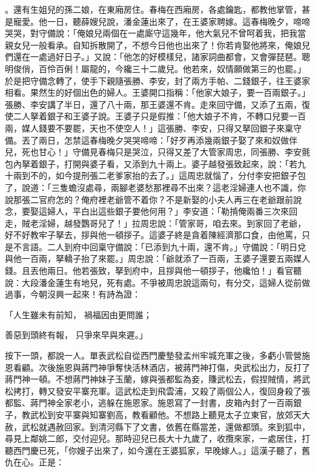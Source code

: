 \begin{showcontents}{}
。還有生姐兒的孫二娘，在東廂房住。春梅在西廂房，各處鑰匙，都教他掌管，甚是寵愛。他一日，聽薛嫂兒說，潘金蓮出來了，在王婆家聘嫁。這春梅晚夕，啼啼哭哭，對守備說：「俺娘兒兩個在一處廝守這幾年，他大氣兒不曾呵着我，把我當親女兒一般看承。自知拆散開了，不想今日他也出來了！你若肯娶他將來，俺娘兒們還在一處過好日子。」又說：「他怎的好模樣兒，諸家詞曲都會，又會彈琵琶。聰明俊俏，百伶百俐！屬龍的，今纔三十二歲兒。他若來，奴情願做第三的也罷。」於是把守備念轉了，使手下親隨張勝、李安，封了兩方手帕、二錢銀子，往王婆家相看。果然生的好個出色的婦人。王婆開口指稱：「他家大娘子，要一百兩銀子。」張勝、李安講了半日，還了八十兩，那王婆還不肯。走來回守備，又添了五兩，復使二人拏着銀子和王婆子說。王婆子只是假推：「他大娘子不肯，不轉口兒要一百兩，媒人錢要不要罷，天也不使空人！」這張勝、李安，只得又拏回銀子來稟守備。丟了兩日，怎禁這春梅晚夕哭哭啼啼：「好歹再添幾兩銀子娶了來和奴做伴兒，死也甘心！」守備見春梅只是哭泣，只得又差了大管家周忠，同張勝、李安氈包內拏着銀子，打開與婆子看，又添到九十兩上。婆子越發張致起來，說：「若九十兩到不的，如今提刑張二老爹家抬的去了。」這周忠就惱了，分付李安把銀子包了，說道：「三隻蟾沒處尋，兩腳老婆愁那裡尋不出來？這老淫婦連人也不識，你說那張二官府怎的？俺府裡老爺管不着你？不是新娶的小夫人再三在老爺跟前說念，要娶這婦人，平白出這些銀子要他何用？」李安道：「勒掯俺兩番三次來回走，賊老淫婦，越發鸚哥兒了！」拉周忠說：「管家哥，咱去來。到家回了老爺，好不好教牢子拏去，拶與他一頓拶子。這婆子終是貪着陳經濟那口食，由他罵，只是不言語。二人到府中回稟守備說：「已添到九十兩，還不肯。」守備說：「明日兌與他一百兩，拏轎子抬了來罷。」周忠說：「爺就添了一百兩，王婆子還要五兩媒人錢。且丟他兩日。他若張致，拏到府中，且拶與他一頓拶子，他纔怕！」看官聽說：大段潘金蓮生有地兒，死有處。不爭被周忠說這兩句，有分交，這婦人從前做過事，今朝沒興一起來！有詩為證：

「人生雖未有前知，  禍福因由更問誰；

善惡到頭終有報，  只爭來早與來遲。」

按下一頭，都說一人。單表武松自從西門慶墊發孟州牢城充軍之後，多虧小管營施恩看顧。次後施恩與蔣門神爭奪快活林酒店，被蔣門神打傷，央武松出力，反打了蔣門神一頓。不想蔣門神妹子玉蘭，嫁與張都監為妾，賺武松去，假捏賊情，將武松拷打，轉又發安平寨充軍。這武松走到飛雲浦，又殺了兩個公人，復回身殺了張都監、蔣門神全家老小，逃躲在施恩家。施恩寫了一封書，皮箱內封了一百兩銀子，教武松到安平寨與知寨劉高，教看顧他。不想路上聽見太子立東官，放郊天大赦，武松就遇赦回家。到清河縣下了文書，依舊在縣當差，還做都頭。來到狐中，尋見上鄰姚二郎，交付迎兒。那時迎兒已長大十九歲了，收攬來家，一處居住，打聽西門慶已死，「你嫂子出來了，如今還在王婆狐家，早晚嫁人。」這漢子聽了，舊仇在心。正是：


\end{showcontents}
